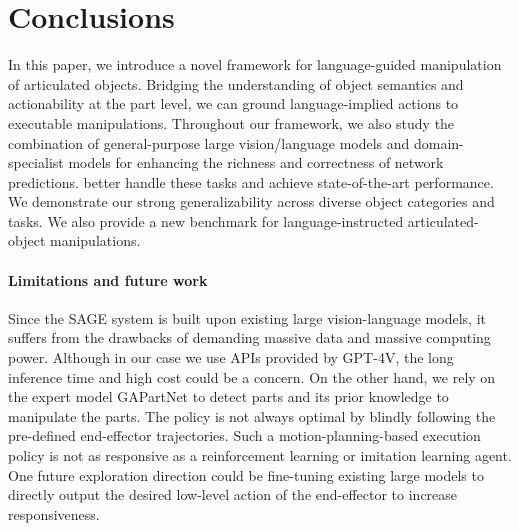 \section{Conclusions}
In this paper, we introduce a novel framework for language-guided manipulation of articulated objects.
Bridging the understanding of object semantics and actionability at the part level, we can ground language-implied actions to executable manipulations.
Throughout our framework, we also study the combination of general-purpose large vision/language models and domain-specialist models for enhancing the richness and correctness of network predictions.  better handle these tasks and achieve state-of-the-art performance.
We demonstrate our strong generalizability across diverse object categories and tasks. We also provide a new benchmark for language-instructed articulated-object manipulations.

\paragraph{Limitations and future work}  
Since the SAGE system is built upon existing large vision-language models, it suffers from the drawbacks of demanding massive data and massive computing power. Although in our case we use APIs provided by GPT-4V, the long inference time and high cost could be a concern. On the other hand, we rely on the expert model GAPartNet to detect parts and its prior knowledge to manipulate the parts. The policy is not always optimal by blindly following the pre-defined end-effector trajectories. Such a motion-planning-based execution policy is not as responsive as a reinforcement learning or imitation learning agent. One future exploration direction could be fine-tuning existing large models to directly output the desired low-level action of the end-effector to increase responsiveness. 
